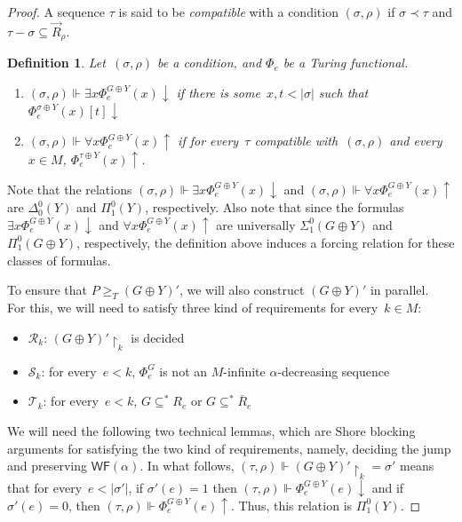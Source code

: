 \documentclass{article}
\numberwithin{theorem}{section}
\newtheorem{definition}[theorem]{Definition}
\newcommand{\WF}{\mathsf{WF}}
\newcommand{\uh}[0]{{\upharpoonright}}
\begin{document}
\begin{proof}
A sequence $\tau$ is said to be \emph{compatible} with a condition $(\sigma,\rho)$ if $\sigma \prec \tau$ and  $\tau - \sigma \subseteq \vec{R}_{\rho}$.

\begin{definition}
Let~$(\sigma, \rho)$ be a condition, and $\Phi_e$ be a Turing functional.
\begin{enumerate}
    \item[1.] $(\sigma, \rho) \Vdash \exists x \Phi^{G \oplus Y}_e(x)\downarrow$ if there is some~$x, t < |\sigma|$ such that $\Phi^{\sigma \oplus Y}_e(x)[t]\downarrow$
    \item[2.] $(\sigma, \rho) \Vdash \forall x \Phi^{G \oplus Y}_e(x)\uparrow$ if for every~$\tau$ compatible with~$(\sigma, \rho)$ and every~$x \in M$, $\Phi^{\tau \oplus Y}_e(x)\uparrow$.
\end{enumerate}
\end{definition}

Note that the relations $(\sigma, \rho) \Vdash \exists x \Phi^{G \oplus Y}_e(x)\downarrow$
and $(\sigma, \rho) \Vdash \forall x \Phi^{G \oplus Y}_e(x)\uparrow$ are $\Delta^0_0(Y)$ and $\Pi^0_1(Y)$, respectively. Also note that since the formulas $\exists x \Phi^{G \oplus Y}_e(x)\downarrow$ and $\forall x \Phi^{G \oplus Y}_e(x)\uparrow$ are universally $\Sigma^0_1(G \oplus Y)$ and $\Pi^0_1(G \oplus Y)$, respectively, the definition above induces a forcing relation for these classes of formulas.

To ensure that $P \geq_T (G \oplus Y)'$, we will also construct $(G \oplus Y)'$ in parallel. \\

For this, we will need to satisfy three kind of requirements for every~$k \in M$:
\begin{itemize}
    \item $\mathcal{R}_k$: $(G \oplus Y)' \uh_k$ is decided
    \item $\mathcal{S}_k$: for every~$e < k$, $\Phi^G_e$ is not an $M$-infinite $\alpha$-decreasing sequence
    \item $\mathcal{T}_k$: for every~$e < k$, $G \subseteq^* R_e$ or $G \subseteq^* \overline{R}_e$
\end{itemize}

We will need the following two technical lemmas, which are Shore blocking arguments for satisfying the two kind of requirements, namely, deciding the jump and preserving $\WF(\alpha)$. In what follows, $(\tau, \rho) \Vdash (G \oplus Y)' \uh_k = \sigma'$ means that for every~$e < |\sigma'|$, if $\sigma'(e) = 1$ then $(\tau, \rho) \Vdash \Phi^{G \oplus Y}_e(e)\downarrow$ and if $\sigma'(e) = 0$, then $(\tau, \rho) \Vdash \Phi^{G \oplus Y}_e(e)\uparrow$. Thus, this relation is $\Pi^0_1(Y)$.


\end{proof}
\end{document}
